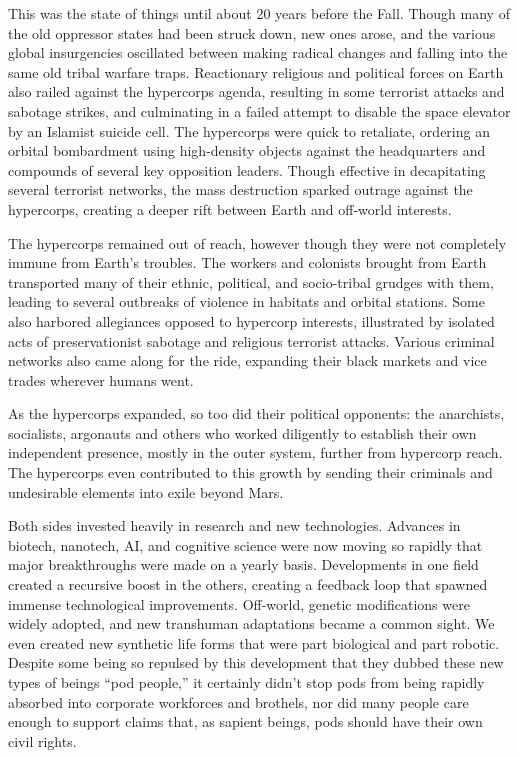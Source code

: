 This was the state of things until about 20 years 
before the Fall. Though many of the old oppressor 
states had been struck down, new ones arose, and 
the various global insurgencies oscillated between 
making radical changes and falling into the same 
old tribal warfare traps. Reactionary religious and 
political forces on Earth also railed against the hypercorps
agenda, resulting in some terrorist attacks and
sabotage strikes, and culminating in a failed attempt 
to disable the space elevator by an Islamist suicide 
cell. The hypercorps were quick to retaliate, ordering 
an orbital bombardment using high-density objects 
against the headquarters and compounds of several 
key opposition leaders. Though effective in decapitating
several terrorist networks, the mass destruction
sparked outrage against the hypercorps, creating a 
deeper rift between Earth and off-world interests.

The hypercorps remained out of reach, however
though they were not completely immune from
Earth's troubles. The workers and colonists brought 
from Earth transported many of their ethnic, political, 
and socio-tribal grudges with them, leading to several 
outbreaks of violence in habitats and orbital stations. 
Some also harbored allegiances opposed to hypercorp 
interests, illustrated by isolated acts of preservationist
sabotage and religious terrorist attacks. Various
criminal networks also came along for the ride, expanding
their black markets and vice trades wherever
humans went.

As the hypercorps expanded, so too did their political
opponents: the anarchists, socialists, argonauts
and others who worked diligently to establish their 
own independent presence, mostly in the outer system, 
further from hypercorp reach. The hypercorps even 
contributed to this growth by sending their criminals 
and undesirable elements into exile beyond Mars.

Both sides invested heavily in research and new 
technologies. Advances in biotech, nanotech, AI, and 
cognitive science were now moving so rapidly that 
major breakthroughs were made on a yearly basis. 
Developments in one field created a recursive boost 
in the others, creating a feedback loop that spawned 
immense technological improvements. Off-world, 
genetic modifications were widely adopted, and new 
transhuman adaptations became a common sight. We 
even created new synthetic life forms that were part 
biological and part robotic. Despite some being so 
repulsed by this development that they dubbed these 
new types of beings ``pod people,'' it certainly didn't 
stop pods from being rapidly absorbed into corporate 
workforces and brothels, nor did many people care 
enough to support claims that, as sapient beings, pods 
should have their own civil rights.

